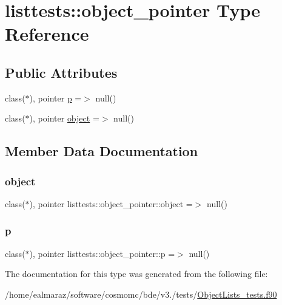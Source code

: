 \hypertarget{structlisttests_1_1object__pointer}{}\section{listtests\+:\+:object\+\_\+pointer Type Reference}
\label{structlisttests_1_1object__pointer}
\subsection*{Public Attributes}
\begin{DoxyCompactItemize}
\item 
class($\ast$), pointer \mbox{\hyperlink{structlisttests_1_1object__pointer_af2f730281b3ebc583ffd756af91aa7b2}{p}} =$>$ null()
\item 
class($\ast$), pointer \mbox{\hyperlink{structlisttests_1_1object__pointer_aaae4bf9d9139455e2dd2d6ff8aae7d77}{object}} =$>$ null()
\end{DoxyCompactItemize}


\subsection{Member Data Documentation}
\mbox{\label{structlisttests_1_1object__pointer_aaae4bf9d9139455e2dd2d6ff8aae7d77}} 
\subsubsection{\texorpdfstring{object}{object}}
{\footnotesize\ttfamily class($\ast$), pointer listtests\+::object\+\_\+pointer\+::object =$>$ null()}

\mbox{\label{structlisttests_1_1object__pointer_af2f730281b3ebc583ffd756af91aa7b2}} 
\subsubsection{\texorpdfstring{p}{p}}
{\footnotesize\ttfamily class($\ast$), pointer listtests\+::object\+\_\+pointer\+::p =$>$ null()}



The documentation for this type was generated from the following file\+:\begin{DoxyCompactItemize}
\item 
/home/ealmaraz/software/cosmomc/bde/v3./tests/\mbox{\hyperlink{ObjectLists__tests_8f90}{Object\+Lists\+\_\+tests.\+f90}}\end{DoxyCompactItemize}
